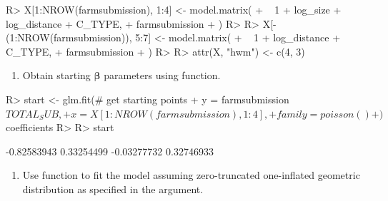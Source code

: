 \documentclass[
]{jss}
\providecommand{\tightlist}{%
  \setlength{\itemsep}{0pt}\setlength{\parskip}{0pt}}
\newcommand{\1}{\mathcal{I}} \newcommand{\bZero}{\boldsymbol{0}}
\begin{document}
\begin{CodeChunk}
\begin{CodeInput}
R> X[1:NROW(farmsubmission), 1:4] <- model.matrix(
+   ~ 1 + log_size + log_distance + C_TYPE, 
+   farmsubmission
+ )
R> 
R> X[-(1:NROW(farmsubmission)), 5:7] <- model.matrix(
+   ~ 1 + log_distance + C_TYPE, 
+   farmsubmission
+ )
R> 
R> attr(X, "hwm") <- c(4, 3)
\end{CodeInput}
\end{CodeChunk}

\begin{enumerate}
\def\labelenumi{\arabic{enumi}.}
\setcounter{enumi}{2}
\tightlist
\item
  Obtain starting \(\boldsymbol{\beta}\) parameters using 
  function.
\end{enumerate}

\begin{CodeChunk}
\begin{CodeInput}
R> start <- glm.fit(# get starting points
+   y = farmsubmission$TOTAL_SUB, 
+   x = X[1:NROW(farmsubmission), 1:4], 
+   family = poisson()
+ )$coefficients
R> 
R> start
\end{CodeInput}
\begin{CodeOutput}
[1] -0.82583943  0.33254499 -0.03277732  0.32746933
\end{CodeOutput}
\end{CodeChunk}

\begin{enumerate}
\def\labelenumi{\arabic{enumi}.}
\setcounter{enumi}{3}
\tightlist
\item
  Use  function to fit the model assuming
  zero-truncated one-inflated geometric distribution as specified in the
   argument.
\end{enumerate}

\begin{CodeChunk}
\end{CodeChunk}
\end{document}
